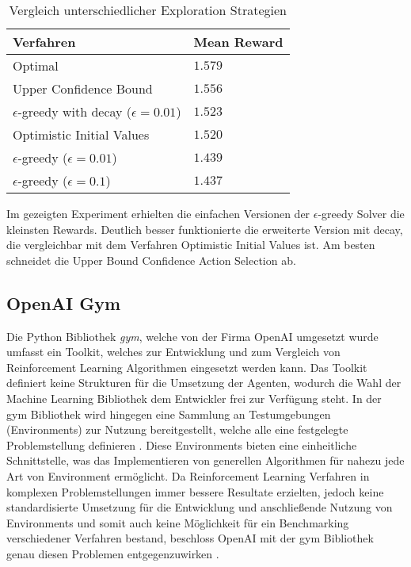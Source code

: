 \documentclass[11pt]{scrartcl}
\begin{document}
\begin{table}[ht]
  \begin{center}
    \begin{tabular}{l | l}
      \textbf{Verfahren} & \textbf{Mean Reward} \\
      \hline
      Optimal & $1.579$\\
      Upper Confidence Bound & $1.556$ \\
      $\epsilon$-greedy with decay ($\epsilon=0.01$) & $1.523$ \\
      Optimistic Initial Values & $1.520$ \\
      $\epsilon$-greedy ($\epsilon=0.01$) & $1.439$ \\
      $\epsilon$-greedy ($\epsilon=0.1$) & $1.437$ \\
    \end{tabular}

    \caption[ExplorationStrategies]{Vergleich unterschiedlicher Exploration Strategien}
    \label{tab:explorationstrategies}
  \end{center}
\end{table}

\noindent
Im gezeigten Experiment erhielten die einfachen Versionen der $\epsilon$-greedy Solver die
kleinsten Rewards. Deutlich besser funktionierte die erweiterte Version mit decay, die
vergleichbar mit dem Verfahren Optimistic Initial Values ist. Am besten schneidet die
Upper Bound Confidence Action Selection ab.

\newpage
\subsection{OpenAI Gym}
Die Python Bibliothek \textit{gym}, welche von der Firma OpenAI umgesetzt wurde umfasst ein
Toolkit, welches zur Entwicklung und zum Vergleich von Reinforcement Learning Algorithmen
eingesetzt werden kann. Das Toolkit definiert keine Strukturen für die Umsetzung der Agenten,
wodurch die Wahl der Machine Learning Bibliothek dem Entwickler frei zur Verfügung steht. In
der gym Bibliothek wird hingegen eine Sammlung an Testumgebungen (Environments) zur Nutzung
bereitgestellt, welche alle eine festgelegte Problemstellung definieren \cite{OAI2016}. 
Diese Environments bieten eine einheitliche Schnittstelle, was das Implementieren von
generellen Algorithmen für nahezu jede Art von Environment ermöglicht. Da Reinforcement
Learning Verfahren in komplexen Problemstellungen immer bessere Resultate erzielten, jedoch
keine standardisierte Umsetzung für die Entwicklung und anschließende Nutzung von Environments
und somit auch keine Möglichkeit für ein Benchmarking verschiedener Verfahren bestand,
beschloss OpenAI mit der gym Bibliothek genau diesen Problemen entgegenzuwirken
\cite{OAI2016}.
\end{document}
